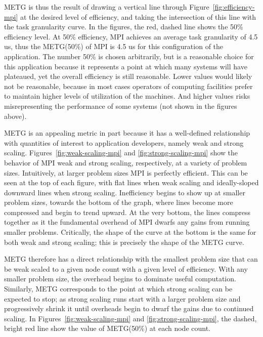 METG is thus the result of drawing a vertical line through
Figure~\ref{fig:efficiency-mpi} at the desired level of efficiency,
and taking the intersection of this line with the task granularity
curve. In the figures, the red, dashed line shows the 50\% efficiency
level. At 50\% efficiency, MPI achieves an average task granularity of
4.5 us, thus the METG(50\%) of MPI is 4.5 us for this configuration of
the application. The number 50\% is chosen arbitrarily, but is a
reasonable choice for this application because it represents a point
at which many systems will have plateaued, yet the overall efficiency
is still reasonable. Lower values would likely not be reasonable,
because in most cases operators of computing facilities prefer to
maintain higher levels of utilization of the machines. And higher
values risks misrepresenting the performance of some systems (not
shown in the figures above).

METG is an appealing metric in part because it has a well-defined
relationship with quantities of interest to application developers,
namely weak and strong scaling. Figures~\ref{fig:weak-scaling-mpi} and
\ref{fig:strong-scaling-mpi} show the behavior of MPI weak and strong
scaling, respectively, at a variety of problem sizes. Intuitively, at
larger problem sizes MPI is perfectly efficient. This can be seen at
the top of each figure, with flat lines when weak scaling and
ideally-sloped downward lines when strong scaling. Inefficiency begins
to show up at smaller problem sizes, towards the bottom of the graph,
where lines become more compressed and begin to trend upward. At the
very bottom, the lines compress together as it the fundamental
overhead of MPI dwarfs any gains from running smaller
problems. Critically, the shape of the curve at the bottom is the same
for both weak and strong scaling; this is precisely the shape of
the METG curve.




METG therefore has a direct relationship with the smallest problem
size that can be weak scaled to a given node count with a given level
of efficiency. With any smaller problem size, 
the overhead begins to dominate useful
computation. Similarly, METG corresponds to the point at which strong
scaling can be expected to stop; as strong scaling runs start with a
larger problem size and progressively shrink it until overheads begin
to dwarf the gains due to continued scaling. In
Figures~\ref{fig:weak-scaling-mpi} and \ref{fig:strong-scaling-mpi},
the dashed, bright red line show the value of METG(50\%) at each node
count.

